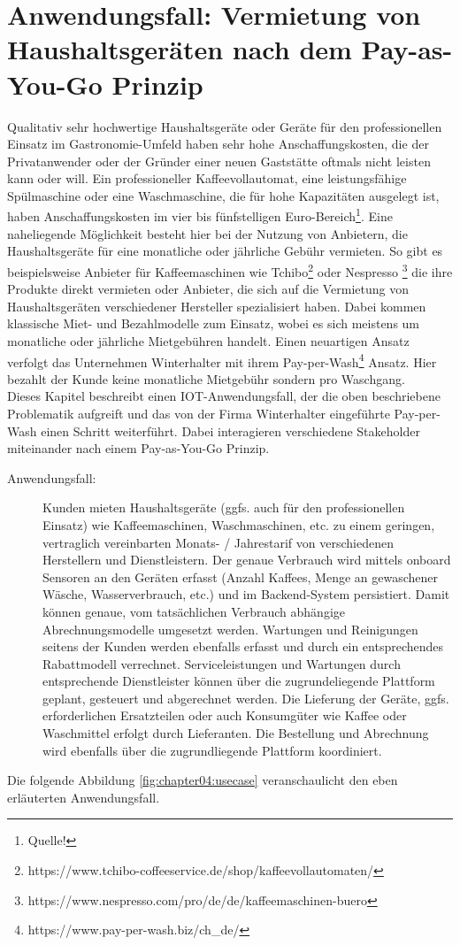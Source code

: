 \chapter{Anwendungsfall: Vermietung von Haushaltsgeräten nach dem Pay-as-You-Go Prinzip}
\label{ch:iot_usecase}
Qualitativ sehr hochwertige Haushaltsgeräte oder Geräte für den professionellen Einsatz im Gastronomie-Umfeld haben sehr hohe Anschaffungskosten, die der Privatanwender oder der Gründer einer neuen Gaststätte oftmals nicht leisten kann oder will. Ein professioneller Kaffeevollautomat, eine leistungsfähige Spülmaschine oder eine Waschmaschine, die für hohe Kapazitäten ausgelegt ist, haben Anschaffungskosten im vier bis fünfstelligen Euro-Bereich\footnote{Quelle!}. Eine naheliegende Möglichkeit besteht hier bei der Nutzung von Anbietern, die Haushaltsgeräte für eine monatliche oder jährliche Gebühr vermieten. So gibt es beispielsweise Anbieter für Kaffeemaschinen wie Tchibo\footnote{https://www.tchibo-coffeeservice.de/shop/kaffeevollautomaten/} oder Nespresso \footnote{https://www.nespresso.com/pro/de/de/kaffeemaschinen-buero} die ihre Produkte direkt vermieten oder Anbieter, die sich auf die Vermietung von Haushaltsgeräten verschiedener Hersteller spezialisiert haben. Dabei kommen klassische Miet- und Bezahlmodelle zum Einsatz, wobei es sich meistens um monatliche oder jährliche Mietgebühren handelt. Einen neuartigen Ansatz verfolgt das Unternehmen Winterhalter mit ihrem Pay-per-Wash\footnote{https://www.pay-per-wash.biz/ch\_de/} Ansatz. Hier bezahlt der Kunde keine monatliche Mietgebühr sondern pro Waschgang.\\
Dieses Kapitel beschreibt einen IOT-Anwendungsfall, der die oben beschriebene Problematik aufgreift und das von der Firma Winterhalter eingeführte Pay-per-Wash einen Schritt weiterführt. Dabei interagieren verschiedene Stakeholder miteinander nach einem Pay-as-You-Go Prinzip.\\
\begin{description}
  \item[Anwendungsfall:] \glqq Kunden mieten Haushaltsgeräte (ggfs. auch für den professionellen Einsatz) wie Kaffeemaschinen, Waschmaschinen, etc. zu einem geringen, vertraglich vereinbarten Monats- / Jahrestarif von verschiedenen Herstellern und Dienstleistern. Der genaue Verbrauch wird mittels onboard Sensoren an den Geräten erfasst (Anzahl Kaffees, Menge an gewaschener Wäsche, Wasserverbrauch, etc.) und im Backend-System persistiert. Damit können genaue, vom tatsächlichen Verbrauch abhängige Abrechnungsmodelle umgesetzt werden. Wartungen und Reinigungen seitens der Kunden werden ebenfalls erfasst und durch ein entsprechendes Rabattmodell verrechnet. Serviceleistungen und Wartungen durch entsprechende Dienstleister können über die zugrundeliegende Plattform geplant, gesteuert und abgerechnet werden. Die Lieferung der Geräte, ggfs. erforderlichen Ersatzteilen oder auch Konsumgüter wie Kaffee oder Waschmittel erfolgt durch Lieferanten. Die Bestellung und Abrechnung wird ebenfalls über die zugrundliegende Plattform koordiniert.\grqq
\end{description}
Die folgende Abbildung \ref{fig:chapter04:usecase} veranschaulicht den eben erläuterten Anwendungsfall.

